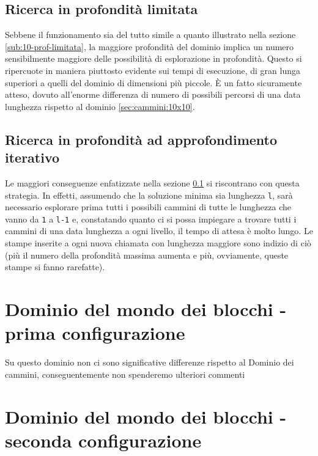 \subsection{Ricerca in profondità limitata} \label{sub:20-prof-limitata}
Sebbene il funzionamento sia del tutto simile a quanto illustrato nella sezione \ref{sub:10-prof-limitata}, la maggiore profondità del dominio implica un numero sensibilmente maggiore delle possibilità di esplorazione in profondità. Questo si ripercuote in maniera piuttosto evidente sui tempi di esecuzione, di gran lunga superiori a quelli del dominio di dimensioni più piccole. È un fatto sicuramente atteso, dovuto all'enorme differenza di numero di possibili percorsi di una data lunghezza rispetto al dominio \ref{sec:cammini:10x10}.

\subsection{Ricerca in profondità ad approfondimento iterativo} \label{sub:20-prof-it}
Le maggiori conseguenze enfatizzate nella sezione \ref{sub:20-prof-limitata} si riscontrano con questa strategia. In effetti, assumendo che la soluzione minima sia lunghezza \texttt{l}, sarà necessario esplorare prima tutti i possibili cammini di tutte le lunghezza che vanno da \texttt{1} a \texttt{l-1} e, constatando quanto ci si possa impiegare a trovare tutti i cammini di una data lunghezza a ogni livello, il tempo di attesa è molto lungo. Le stampe inserite a ogni nuova chiamata con lunghezza maggiore sono indizio di ciò (più il numero della profondità massima aumenta e più, ovviamente, queste stampe si fanno rarefatte).

\section{Dominio del mondo dei blocchi - prima configurazione}

Su questo dominio non ci sono significative differenze rispetto al Dominio dei cammini, conseguentemente non spenderemo ulteriori commenti

\section{Dominio del mondo dei blocchi - seconda configurazione}

